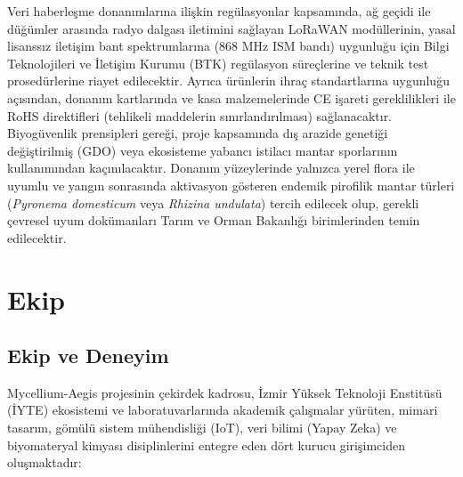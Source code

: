 \documentclass[11pt,a4paper]{article}
\begin{document}
Veri haberleşme donanımlarına ilişkin regülasyonlar kapsamında, ağ geçidi ile düğümler arasında radyo dalgası iletimini sağlayan LoRaWAN modüllerinin, yasal lisanssız iletişim bant spektrumlarına (868 MHz ISM bandı) uygunluğu için Bilgi Teknolojileri ve İletişim Kurumu (BTK) regülasyon süreçlerine ve teknik test prosedürlerine riayet edilecektir. Ayrıca ürünlerin ihraç standartlarına uygunluğu açısından, donanım kartlarında ve kasa malzemelerinde CE işareti gereklilikleri ile RoHS direktifleri (tehlikeli maddelerin sınırlandırılması) sağlanacaktır. Biyogüvenlik prensipleri gereği, proje kapsamında dış arazide genetiği değiştirilmiş (GDO) veya ekosisteme yabancı istilacı mantar sporlarının kullanımından kaçınılacaktır. Donanım yüzeylerinde yalnızca yerel flora ile uyumlu ve yangın sonrasında aktivasyon gösteren endemik pirofilik mantar türleri (\textit{Pyronema domesticum} veya \textit{Rhizina undulata}) tercih edilecek olup, gerekli çevresel uyum dokümanları Tarım ve Orman Bakanlığı birimlerinden temin edilecektir.

\section{Ekip}

\subsection{Ekip ve Deneyim}

Mycellium-Aegis projesinin çekirdek kadrosu, İzmir Yüksek Teknoloji Enstitüsü (İYTE) ekosistemi ve laboratuvarlarında akademik çalışmalar yürüten, mimari tasarım, gömülü sistem mühendisliği (IoT), veri bilimi (Yapay Zeka) ve biyomateryal kimyası disiplinlerini entegre eden dört kurucu girişimciden oluşmaktadır:
\end{document}
